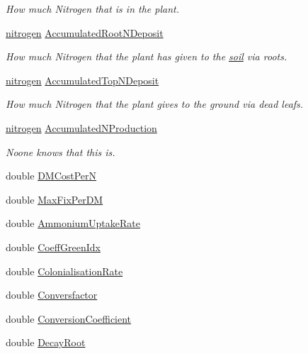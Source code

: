 \begin{DoxyCompactItemize}
\begin{DoxyCompactList}\small\item\em How much Nitrogen that is in the plant. \item\end{DoxyCompactList}\item 
\hyperlink{classnitrogen}{nitrogen} \hyperlink{classcrop_aa050617ad81407650b6bd3150b8c5b93}{AccumulatedRootNDeposit}
\begin{DoxyCompactList}\small\item\em How much Nitrogen that the plant has given to the \hyperlink{classsoil}{soil} via roots. \item\end{DoxyCompactList}\item 
\hyperlink{classnitrogen}{nitrogen} \hyperlink{classcrop_ad9583ee2f76a5141a1a54ebea83627fe}{AccumulatedTopNDeposit}
\begin{DoxyCompactList}\small\item\em How much Nitrogen that the plant gives to the ground via dead leafs. \item\end{DoxyCompactList}\item 
\hyperlink{classnitrogen}{nitrogen} \hyperlink{classcrop_ac99038132c4676e35b98265edb34a213}{AccumulatedNProduction}
\begin{DoxyCompactList}\small\item\em Noone knows that this is. \item\end{DoxyCompactList}\item 
double \hyperlink{classcrop_af06dc09d391a57692b440c7c492dbc41}{DMCostPerN}
\item 
double \hyperlink{classcrop_acd7a9182db99895de016c87785b58cc9}{MaxFixPerDM}
\item 
double \hyperlink{classcrop_a1707be6e4080e9ca3c3f24d6ffe0d6fa}{AmmoniumUptakeRate}
\item 
double \hyperlink{classcrop_a668a3be41e3f465357ee7ad27e261a02}{CoeffGreenIdx}
\item 
double \hyperlink{classcrop_a787dec1e35057a17b4837bc01fc34350}{ColonialisationRate}
\item 
double \hyperlink{classcrop_a3a262508a417bdfee36e9961ec283d96}{Conversfactor}
\item 
double \hyperlink{classcrop_ab60ba190cccea48dbc2b7112b663545e}{ConversionCoefficient}
\item 
double \hyperlink{classcrop_afe8c6c11905d19aca8f9623180b8462f}{DecayRoot}

\end{DoxyCompactItemize}
